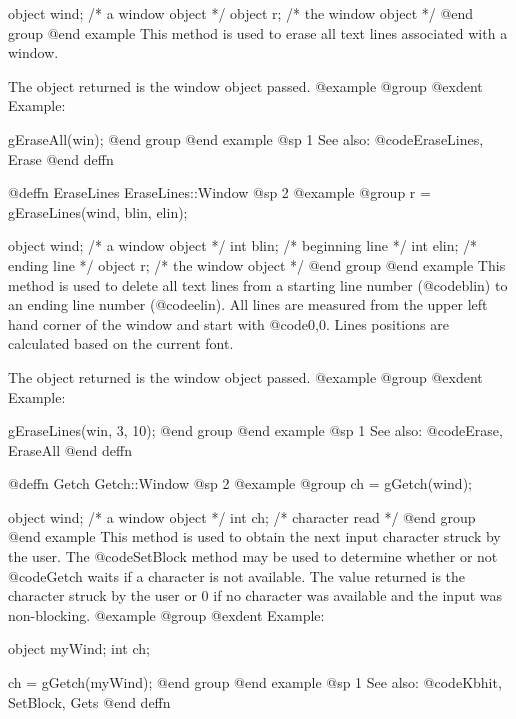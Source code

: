 object  wind;   /*  a window object     */
object  r;      /*  the window object   */
@end group
@end example
This method is used to erase all text lines associated with a window.

The object returned is the window object passed.
@example
@group
@exdent Example:

gEraseAll(win);
@end group
@end example
@sp 1
See also:  @code{EraseLines, Erase}
@end deffn










@deffn {EraseLines} EraseLines::Window
@sp 2
@example
@group
r = gEraseLines(wind, blin, elin);

object  wind;   /*  a window object     */
int     blin;   /*  beginning line      */
int     elin;   /*  ending line         */
object  r;      /*  the window object   */
@end group
@end example
This method is used to delete all text lines from a starting line number
(@code{blin}) to an ending line number (@code{elin}). All lines are
measured from the upper left hand corner of the window and start with
@code{0,0}.  Lines positions are calculated based on the current font.

The object returned is the window object passed.
@example
@group
@exdent Example:

gEraseLines(win, 3, 10);
@end group
@end example
@sp 1
See also:  @code{Erase, EraseAll}
@end deffn









@deffn {Getch} Getch::Window
@sp 2
@example
@group
ch = gGetch(wind);

object  wind;   /*  a window object   */
int     ch;     /*  character read    */
@end group
@end example
This method is used to obtain the next input character struck by the
user.  The @code{SetBlock} method may be used to determine whether or not
@code{Getch} waits if a character is not available.  The value returned
is the character struck by the user or 0 if no character was available
and the input was non-blocking.
@example
@group
@exdent Example:

object  myWind;
int     ch;

ch = gGetch(myWind);
@end group
@end example
@sp 1
See also:  @code{Kbhit, SetBlock, Gets}
@end deffn
















